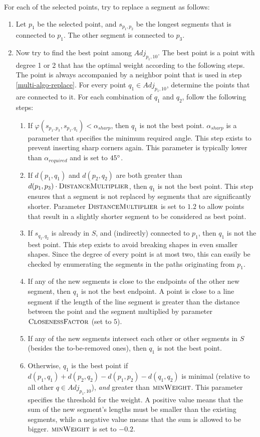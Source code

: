 \documentclass[11pt]{article}
\begin{document}
For each of the selected points, try to replace a segment as follows:

\begin{enumerate}
\item Let $p_1$ be the selected point, and $s_{p_1,p_2}$ be the longest segments that is connected to $p_1$. The other segment is connected to $p_3$.
\item Now try to find the best point among $Adj_{p_1,10}$. The best point is a point with degree 1 or 2 that has the optimal weight according to the following steps. The point is always accompanied by a neighbor point that is used in step \ref{multi-algo-replace}.
For every point $q_1 \in Adj_{p_1,10}$, determine the points that are connected to it. For each combination of $q_1$ and $q_2$, follow the following steps:
  \begin{enumerate}
  \item If $\varphi(s_{p_1,p_3}, s_{p_1,q_1}) < \alpha_{sharp}$, then $q_1$ is not the best point. $\alpha_{sharp}$ is a parameter that specifies the minimum required angle. This step exists to prevent inserting sharp corners again. This parameter is typically lower than $\alpha_{required}$ and is set to $45\degree$.
  \item If $d(p_1, q_1)$ and $d(p_2,q_2)$ are both greater than $d(p_1,p_3) \cdot \textsc{DistanceMultiplier}$, then $q_1$ is not the best point.
  This step ensures that a segment is not replaced by segments that are significantly shorter.
  Parameter $\textsc{DistanceMultiplier}$ is set to $1.2$ to allow points that result in a slightly shorter segment to be considered as best point.
  \item If $s_{q_1,q_2}$ is already in $S$, and (indirectly) connected to $p_1$, then $q_1$ is not the best point. This step exists to avoid breaking shapes in even smaller shapes. Since the degree of every point is at most two, this can easily be checked by enumerating the segments in the paths originating from $p_1$.
  \item If any of the new segments is close to the endpoints of the other new segment, then $q_1$ is not the best endpoint. A point is close to a line segment if the length of the line segment is greater than the distance between the point and the segment multiplied by parameter $\textsc{ClosenessFactor}$ (set to $5$).
  \item If any of the new segments intersect each other or other segments in $S$ (besides the to-be-removed ones), then $q_1$ is not the best point.
  \item Otherwise, $q_1$ is the best point if $d(p_1,q_1) + d(p_2,q_2) - d(p_1,p_2) - d(q_1,q_2)$ is minimal (relative to all other $q \in Adj_{p_1,10}$), \textit{and} greater than $\textsc{minWeight}$. This parameter specifies the threshold for the weight. A positive value means that the sum of the new segment's lengths must be smaller than the existing segments, while a negative value means that the sum is allowed to be bigger. $\textsc{minWeight}$ is set to $-0.2$.
  \end{enumerate}


\end{enumerate}
\end{document}
